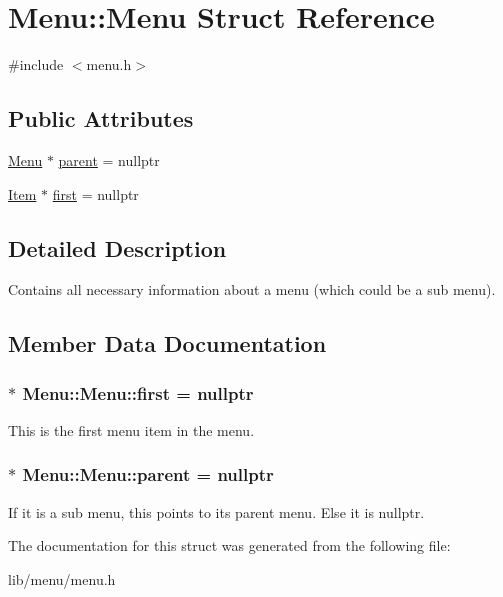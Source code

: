 \hypertarget{struct_menu_1_1_menu}{\section{Menu\-:\-:Menu Struct Reference}
\label{struct_menu_1_1_menu}
}


{\ttfamily \#include $<$menu.\-h$>$}

\subsection*{Public Attributes}
\begin{DoxyCompactItemize}
\item 
\hyperlink{struct_menu_1_1_menu}{Menu} $\ast$ \hyperlink{struct_menu_1_1_menu_accedb5340f42f80cf0876b4d1e4df512}{parent} = nullptr
\item 
\hyperlink{struct_menu_1_1_item}{Item} $\ast$ \hyperlink{struct_menu_1_1_menu_aa9cb1f287490ac21ebac38e997c21af0}{first} = nullptr
\end{DoxyCompactItemize}


\subsection{Detailed Description}
Contains all necessary information about a menu (which could be a sub menu). 

\subsection{Member Data Documentation}
\hypertarget{struct_menu_1_1_menu_aa9cb1f287490ac21ebac38e997c21af0}{
\subsubsection[{first}]{$\ast$ Menu\-::\-Menu\-::first = nullptr}}\label{struct_menu_1_1_menu_aa9cb1f287490ac21ebac38e997c21af0}
This is the first menu item in the menu. \hypertarget{struct_menu_1_1_menu_accedb5340f42f80cf0876b4d1e4df512}{
\subsubsection[{parent}]{$\ast$ Menu\-::\-Menu\-::parent = nullptr}}\label{struct_menu_1_1_menu_accedb5340f42f80cf0876b4d1e4df512}
If it is a sub menu, this points to its parent menu. Else it is nullptr. 

The documentation for this struct was generated from the following file\-:\begin{DoxyCompactItemize}
\item 
lib/menu/menu.\-h\end{DoxyCompactItemize}
